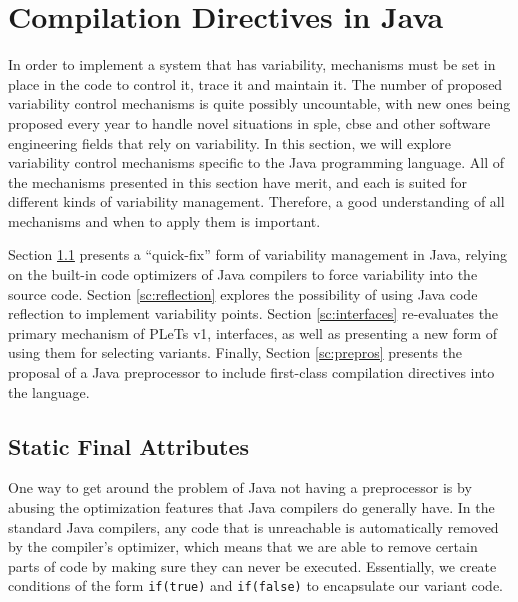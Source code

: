 
\section{Compilation Directives in Java}
\label{sc:compjava}

In order to implement a system that has \gls{variability}, mechanisms must be set in place in the code to control it, trace it and maintain it. The number of proposed \gls{variability} control mechanisms is quite possibly uncountable, with new ones being proposed every year to handle novel situations in \acrshort{sple}, \acrshort{cbse} and other software engineering fields that rely on \gls{variability}. In this section, we will explore \gls{variability} control mechanisms specific to the Java programming language. All of the mechanisms presented in this section have merit, and each is suited for different kinds of \gls{variability} management. Therefore, a good understanding of all mechanisms and when to apply them is important.

Section \ref{sc:sfa} presents a ``quick-fix'' form of \gls{variability} management in Java, relying on the built-in code optimizers of Java compilers to force \gls{variability} into the source code. Section \ref{sc:reflection} explores the possibility of using Java code reflection to implement \gls{variability} points. Section \ref{sc:interfaces} re-evaluates the primary mechanism of PLeTs v1, interfaces, as well as presenting a new form of using them for selecting \gls{variant}s. Finally, Section \ref{sc:prepros} presents the proposal of a Java preprocessor to include first-class compilation directives into the language.


\subsection{Static Final Attributes}
\label{sc:sfa}

One way to get around the problem of Java not having a preprocessor is by abusing the optimization features that Java compilers do generally have. In the standard Java compilers, any code that is unreachable is automatically removed by the compiler's optimizer, which means that we are able to remove certain parts of code by making sure they can never be executed. Essentially, we create conditions of the form \lstinline{if(true)} and \lstinline{if(false)} to encapsulate our \gls{variant} code.

